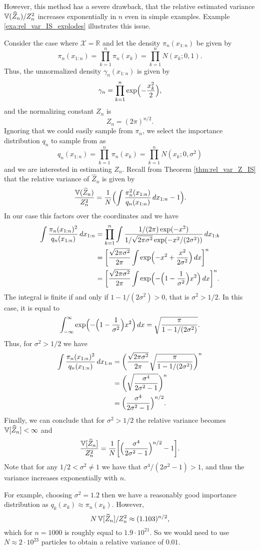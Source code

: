 However, this method has a severe drawback, that the relative estimated variance $\operatorname{\mathbb{V}}(\widehat{Z}_n)/Z_n^2$ increases exponentially in $n$ even in simple examples. Example \ref{exa:rel_var_IS_explodes} illustrates this issue.
\begin{example}
	\label{exa:rel_var_IS_explodes}
	Consider the case where $\mathcal{X}=\mathbb{R}$ and let the density $\pi_n(x_{1:n})$ be given by
	\[
	\pi_n(x_{1:n})=\prod_{k=1}^n \pi_n(x_k)=\prod_{k=1}^n N(x_k; 0, 1).
	\]
	Thus, the unnormalized density $\gamma_n(x_{1:n})$ is given by
	\[
	\gamma_n=\prod_{k=1}^n \exp\Bigl(-\frac{x_k^2}{2}\Bigr),
	\]
	and the normalizing constant $Z_n$ is
	\[
	Z_n=(2\pi)^{n/2}.
	\]
	Ignoring that we could easily sample from $\pi_n$, we select the importance distribution $q_n$ to sample from as
	\[q_n(x_{1:n})=\prod_{k=1}^n \pi_n(x_k)=\prod_{k=1}^n N(x_k; 0, \sigma^2)\]
	and we are interested in estimating $Z_n$. Recall from Theorem \ref{thm:rel_var_Z_IS} that the relative variance of $\widehat{Z}_n$ is given by
	\[
	\frac{\operatorname{\mathbb{V}}(\widehat{Z}_n)}{Z_n^2}=\frac{1}{N}\Bigl(\int \frac{\pi_n^2(x_{1:n})}{q_n(x_{1:n})}\, dx_{1:n}-1\Bigr).
	\]
	In our case this factors over the coordinates and we have
	\begin{align*}
		\int \frac{\pi_n(x_{1:n})^2}{q_n(x_{1:n})}\, dx_{1:n}&=\prod_{k=1}^{n}\int \frac{1/(2\pi)\exp(-x^2)}{1/\sqrt{2\pi\sigma^2}\exp(-x^2/(2\sigma^2))}\, dx_{1:k} \\
		&=\biggl[\frac{\sqrt{2\pi\sigma^2}}{2\pi}\int \exp\Bigl(-x^2+\frac{x^2}{2\sigma^2}\Bigr)\, dx \biggr]^n \\
		&=\biggl[\frac{\sqrt{2\pi\sigma^2}}{2\pi}\int \exp\Bigl(-\Bigl(1-\frac{1}{\sigma^2}\Bigr)x^2\Bigr)\, dx \biggr]^n.
	\end{align*}
	The integral is finite if and only if $1-1/(2\sigma^2)>0$, that is $\sigma^2>1/2$. In this case, it is equal to 
	\[
	\int_{-\infty}^{\infty} \exp\Bigl(-\Bigl(1-\frac{1}{\sigma^2}\Bigr)x^2\Bigr)\, dx=\sqrt{\frac{\pi}{1-1/(2\sigma^2)}}.
	\]
	Thus, for $\sigma^2>1/2$ we have
	\begin{align*}
		\int \frac{\pi_n(x_{1:n})^2}{q_n(x_{1:n})}\, dx_{1:n} &=\biggl(\frac{\sqrt{2\pi\sigma^2}}{2\pi} \sqrt{\frac{\pi}{1-1/(2\sigma^2)}}\biggr)^n \\
		&=\biggl(\sqrt{\frac{\sigma^4}{2\sigma^2-1}}\biggr)^n \\
		&=\Bigl(\frac{\sigma^4}{2\sigma^2-1}\Bigr)^{n/2}.
	\end{align*}
	Finally, we can conclude that for $\sigma^2>1/2$ the relative variance becomes $\operatorname{\mathbb{V}}[\widehat{Z}_n]<\infty$ and 
	\[
	\frac{\operatorname{\mathbb{V}}[\widehat{Z}_n]}{Z_n^2}=\frac{1}{N}\biggl[\Bigl(\frac{\sigma^4}{2\sigma^2-1}\Bigr)^{n/2}-1\biggr].
	\]
	Note that for any $1/2<\sigma^2\neq 1$ we have that $\sigma^4/(2\sigma^2-1)>1$, and thus the variance increases exponentially with $n$. 
	
	For example, choosing $\sigma^2=1.2$ then we have a reasonably good importance distribution as $q_k(x_k) \approx \pi_n(x_k)$. However,  
	\[
	N\operatorname{\mathbb{V}}[\widehat{Z}_n]/Z_n^2\approx (1.103)^{n/2},
	\]
	which for $n=1000$ is roughly equal to $1.9\cdot 10^{21}$. So we would need to use $N\approx 2\cdot 10^{23}$ particles to obtain a relative variance of $0.01$.
\end{example}
